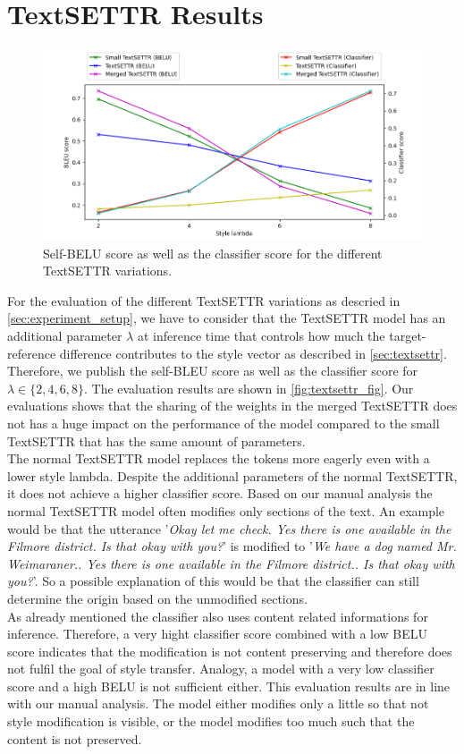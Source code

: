 \documentclass[twocolumn]{tum-article}
\begin{document}
\section{TextSETTR Results}
\begin{figure}[!h]
\centering
\includegraphics[width=\textwidth]{figures/eval_plot.png}
\caption{Self-BELU score as well as the classifier score for the different TextSETTR variations.}
\label{fig:textsettr_fig}
\end{figure}
For the evaluation of the different TextSETTR variations as descried in \autoref{sec:experiment_setup}, we have to consider that the TextSETTR model has an additional parameter $\lambda$ at inference time that controls how much the target-reference difference contributes to the style vector as described in \autoref{sec:textsettr}. Therefore, we publish the self-BLEU score as well as the classifier score for $\lambda \in \{2,4,6,8\}$. The evaluation results are shown in \autoref{fig:textsettr_fig}. Our evaluations shows that the sharing of the weights in the merged TextSETTR does not has a huge impact on the performance of the model compared to the small TextSETTR that has the same amount of parameters.\\ 
The normal TextSETTR model replaces the tokens more eagerly even with a lower style lambda. Despite the additional parameters of the normal TextSETTR, it does not achieve a higher classifier score. Based on our manual analysis the normal TextSETTR model often modifies only sections of the text. An example would be that the utterance '\textit{Okay let me check. Yes there is one available in the Filmore district. Is that okay with you?}' is modified to '\textit{We have a dog named Mr. Weimaraner.. Yes there is one available in the Filmore district.. Is that okay with you?}'. So a possible explanation of this would be that the classifier can still determine the origin based on the unmodified sections.\\
As already mentioned the classifier also uses content related informations for inference. Therefore, a very hight classifier score combined with a low BELU score indicates that the modification is not content preserving and therefore does not fulfil the goal of style transfer. Analogy, a model with a very low classifier score and a high BELU is not sufficient either. This evaluation results are in line with our manual analysis. The model either modifies only a little so that not style modification is visible, or the model modifies too much such that the content is not preserved. 
\end{document}
